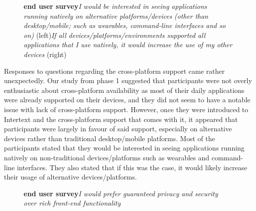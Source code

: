 \begin{figure}[H]
\centering
{}
\vspace*{-5mm}
\caption{\textbf{end user survey}\newline\textit{I would be interested in seeing applications running natively on alternative platforms/devices (other than desktop/mobile; such as wearables, command-line interfaces and so on)} (left)\newline\textit{If all devices/platforms/environments supported all applications that I use natively, it would increase the use of my other devices} (right)} \label{fig:ev_p2_5}
\end{figure}

Responses to questions regarding the cross-platform support came rather unexpectedly. Our study from phase 1 suggested that participants were not overly enthusiastic about cross-platform availability as most of their daily applications were already supported on their devices, and they did not seem to have a notable issue with lack of cross-platform support. However, once they were introduced to Intertext and the cross-platform support that comes with it, it appeared that participants were largely in favour of said support, especially on alternative devices rather than traditional desktop/mobile platforms. Most of the participants stated that they would be interested in seeing applications running natively on non-traditional devices/platforms such as wearables and command-line interfaces. They also stated that if this was the case, it would likely increase their usage of alternative devices/platforms.


\begin{figure}[H]
\centering
{}
\vspace*{-1mm}
\caption{\textbf{end user survey}\newline\textit{I would prefer guaranteed privacy and security over rich front-end functionality}} \label{fig:ev_p2_6}
\end{figure}

